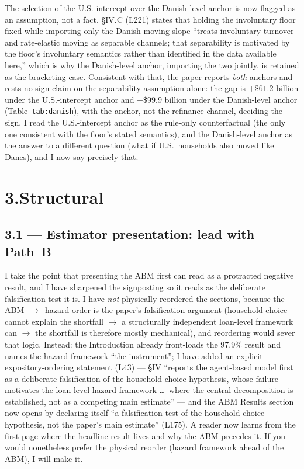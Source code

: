 \documentclass[11pt]{article}
\newcommand{\mlabel}[1]{\texttt{#1}}
\begin{document}
The selection of the U.S.-intercept over the Danish-level anchor is now flagged
as an assumption, not a fact. \S IV.C (L221) states that holding the
involuntary floor fixed while importing only the Danish moving slope ``treats
involuntary turnover and rate-elastic moving as separable channels; that
separability is motivated by the floor's involuntary semantics rather than
identified in the data available here,'' which is why the Danish-level anchor,
importing the two jointly, is retained as the bracketing case. Consistent with
that, the paper reports \emph{both} anchors and rests no sign claim on the
separability assumption alone: the gap is $+\$61.2$ billion under the
U.S.-intercept anchor and $-\$99.9$ billion under the Danish-level anchor
(Table~\mlabel{tab:danish}), with the anchor, not the refinance channel,
deciding the sign. I read the U.S.-intercept anchor as the rule-only
counterfactual (the only one consistent with the floor's stated semantics), and
the Danish-level anchor as the answer to a different question (what if U.S.\
households also moved like Danes), and I now say precisely that.

\section*{3.\quad Structural}

\subsection*{3.1 --- Estimator presentation: lead with Path~B}

I take the point that presenting the ABM first can read as a protracted
negative result, and I have sharpened the signposting so it reads as the
deliberate falsification test it is. I have \emph{not} physically reordered the
sections, because the ABM~$\rightarrow$~hazard order is the paper's
falsification argument (household choice cannot explain the shortfall
$\rightarrow$ a structurally independent loan-level framework can $\rightarrow$
the shortfall is therefore mostly mechanical), and reordering would sever that
logic. Instead: the Introduction already front-loads the 97.9\% result and
names the hazard framework ``the instrument''; I have added an explicit
expository-ordering statement (L43) --- \S IV ``reports the agent-based model
first as a deliberate falsification of the household-choice hypothesis, whose
failure motivates the loan-level hazard framework \ldots\ where the central
decomposition is established, not as a competing main estimate'' --- and the
ABM Results section now opens by declaring itself ``a falsification test of the
household-choice hypothesis, not the paper's main estimate'' (L175). A reader
now learns from the first page where the headline result lives and why the ABM
precedes it. If you would nonetheless prefer the physical reorder (hazard
framework ahead of the ABM), I will make it.
\end{document}
